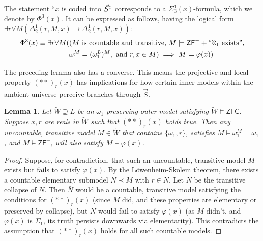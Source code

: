 \documentclass[a4paper,11pt]{article}
\newtheorem{lemma}[theorem]{Lemma}
\newcommand{\ZFC}{\mathsf{ZFC}}
\newcommand{\ZFP}{\mathsf{ZF}^-}
\begin{document}
The statement ``$x$ is coded into $\vec{S}"$ corresponds to a $\Sigma^1_3(x)$-formula, which we denote by $\Phi^3(x)$. It can be expressed as follows, having the logical form $\exists r \forall M (\Delta^1_2(r,M,x) \rightarrow \Delta^1_2(r,M,x))$:
\begin{align*}
\Phi^3 (x) \equiv \exists r \forall M ( & ( M \text{ is countable and transitive, } M \models \ZFP + ``\aleph_1 \text{ exists}", \\ & \omega_1^M = (\omega_1^L)^M, \text{ and } r, x \in M ) \implies M \models \varphi(x) )
\end{align*}

The preceding lemma also has a converse. This means the projective and local property $(\ast \ast)_r(x)$ has implications for how certain inner models within the ambient universe perceive branches through $\vec{S}$.

\begin{lemma}
Let $\tilde{W} \supseteq L$ be an $\omega_1$-preserving outer model satisfying $\tilde{W} \models \ZFC$. Suppose $x, r$ are reals in $\tilde{W}$ such that $(\ast \ast)_r(x)$ holds true. Then any uncountable, transitive model $M \in \tilde{W}$ that contains $\{\omega_1, r\}$, satisfies $M \models \omega_1^M = \omega_1$, and $M \models \ZFP$, will also satisfy $M \models \varphi(x)$.
\end{lemma}

\begin{proof}
Suppose, for contradiction, that such an uncountable, transitive model $M$ exists but fails to satisfy $\varphi(x)$. By the Löwenheim-Skolem theorem, there exists a countable elementary submodel $N \prec M$ with $r \in N$. Let $\bar{N}$ be the transitive collapse of $N$. Then $\bar{N}$ would be a countable, transitive model satisfying the conditions for $(\ast \ast)_r(x)$ (since $M$ did, and these properties are elementary or preserved by collapse), but $\bar{N}$ would fail to satisfy $\varphi(x)$ (as $M$ didn't, and $\varphi(x)$ is $\Sigma_1$, its truth persists downwards via elementarity). This contradicts the assumption that $(\ast \ast)_r(x)$ holds for all such countable models.
\end{proof}
\end{document}
